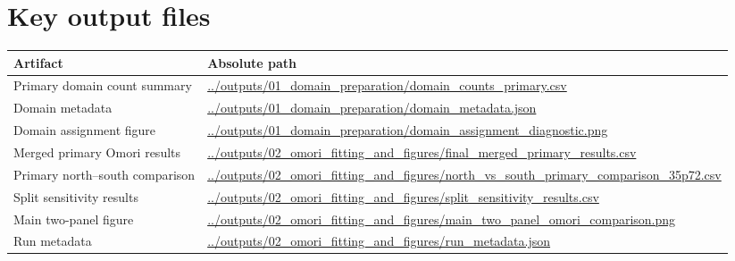 \documentclass[11pt]{article}
\begin{document}
\section*{Key output files}
\begin{longtable}{>{\RaggedRight\arraybackslash}p{3.2cm} >{\RaggedRight\arraybackslash}p{10.5cm}}
\toprule
Artifact & Absolute path \\
\midrule
Primary domain count summary & \url{../outputs/01_domain_preparation/domain_counts_primary.csv} \\
Domain metadata & \url{../outputs/01_domain_preparation/domain_metadata.json} \\
Domain assignment figure & \url{../outputs/01_domain_preparation/domain_assignment_diagnostic.png} \\
Merged primary Omori results & \url{../outputs/02_omori_fitting_and_figures/final_merged_primary_results.csv} \\
Primary north--south comparison & \url{../outputs/02_omori_fitting_and_figures/north_vs_south_primary_comparison_35p72.csv} \\
Split sensitivity results & \url{../outputs/02_omori_fitting_and_figures/split_sensitivity_results.csv} \\
Main two-panel figure & \url{../outputs/02_omori_fitting_and_figures/main_two_panel_omori_comparison.png} \\
Run metadata & \url{../outputs/02_omori_fitting_and_figures/run_metadata.json} \\
\bottomrule
\end{longtable}
\end{document}
